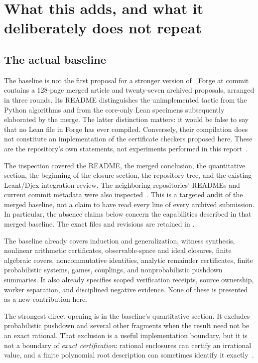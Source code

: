 \section{What this adds, and what it deliberately does not repeat}
\subsection{The actual baseline}
The baseline is not the first proposal for a stronger version of . Forge at commit  contains a 128-page merged article and twenty-seven archived proposals, arranged in three rounds. Its README distinguishes the unimplemented tactic from the Python algorithms and from the core-only Lean specimens subsequently elaborated by the merge. The latter distinction matters: it would be false to say that no Lean file in Forge has ever compiled. Conversely, their compilation does not constitute an implementation of the certificate checkers proposed here. These are the repository's own statements, not experiments performed in this report~\cite{forge-readme}.

The inspection covered the README, the merged conclusion, the quantitative section, the beginning of the closure section, the repository tree, and the existing Leant/Djex integration review. The neighboring repositories' READMEs and current commit metadata were also inspected~\cite{forge-quant,forge-closure,forge-neighbors,leant,djex}. This is a targeted audit of the merged baseline, not a claim to have read every line of every archived submission. In particular, the absence claims below concern the capabilities described in that merged baseline. The exact files and revisions are retained in .

The baseline already covers induction and generalization, witness synthesis, nonlinear arithmetic certificates, observable-space and ideal closures, finite algebraic covers, noncommutative identities, analytic remainder certificates, finite probabilistic systems, games, couplings, and nonprobabilistic pushdown summaries. It also already specifies scoped verification receipts, source ownership, worker separation, and disciplined negative evidence. None of these is presented as a new contribution here.

The strongest direct opening is in the baseline's quantitative section. It excludes probabilistic pushdown and several other fragments when the result need not be an exact rational. That exclusion is a useful implementation boundary, but it is not a boundary of \emph{exact certification}: rational enclosures can certify an irrational value, and a finite polynomial root description can sometimes identify it exactly~\cite{forge-quant,etessami-yannakakis}.

